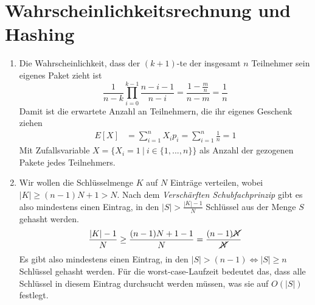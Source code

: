 \documentclass[a4paper,10pt]{article}
\begin{document}
\section{Wahrscheinlichkeitsrechnung und Hashing}
\begin{enumerate}
\item   Die Wahrscheinlichkeit, dass der $(k+1)$-te der insgesamt $n$ Teilnehmer sein eigenes Paket zieht ist
        \[
            \frac{1}{n-k} \prod\limits_{i=0}^{k-1} \frac{n-i-1}{n-i} = \frac{1-\frac{m}{n}}{n-m} = \frac{1}{n}
        \]
        Damit ist die erwartete Anzahl an Teilnehmern, die ihr eigenes Geschenk ziehen
        \begin{align*}
            E[X] &= \sum\limits_{i = 1}^{n} X_i p_i = \sum\limits_{i = 1}^{n} \frac{1}{n} = 1
        \end{align*}
        Mit Zufallsvariable $X = \{X_i = 1\ |\ i \in \{1, ..., n\}\}$ als Anzahl der gezogenen Pakete jedes Teilnehmers.
\item   Wir wollen die Schlüsselmenge $K$ auf $N$ Einträge verteilen, wobei $|K| \geq (n-1)N + 1 > N$. 
        Nach dem \emph{Verschärften Schubfachprinzip} gibt es also mindestens einen Eintrag, in den $|S| > \frac{|K| - 1}{N}$ Schlüssel aus der Menge $S$ gehasht werden.
        \begin{align*}
            \frac{|K| - 1}{N} &\geq \frac{(n-1)N+1-1}{N} = \frac{(n-1)\cancel{N}}{\cancel{N}} \\
        \end{align*}
        Es gibt also mindestens einen Eintrag, in den $|S| > (n-1) \Leftrightarrow |S| \geq n$ Schlüssel gehasht werden. Für die worst-case-Laufzeit bedeutet das, dass alle Schlüssel in diesem Eintrag durchsucht werden müssen, was sie auf $O(|S|)$ festlegt.
\end{enumerate}
\end{document}

